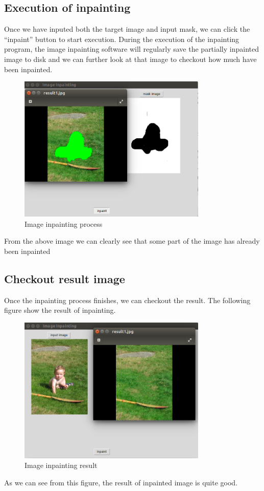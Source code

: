 \subsection{Execution of inpainting}
Once we have inputed both the target image and input mask, we can click the ``inpaint'' button to start execution. During the execution of the inpainting program, the image inpainting software will regularly save the partially inpainted image to disk and we can further look at that image to checkout how much have been inpainted.
\begin{figure}[H]
\centering
\includegraphics[width=9cm]{ex_ex.png}
\caption{Image inpainting process}
\end{figure}
From the above image we can clearly see that some part of the image has already been inpainted
\subsection{Checkout result image}
Once the inpainting process finishes, we can checkout the result. The following figure show the result of inpainting.
\begin{figure}[H]
\centering
\includegraphics[width=9cm]{ex_res.png}
\caption{Image inpainting result}
\end{figure}
As we can see from this figure, the result of inpainted image is quite good.

